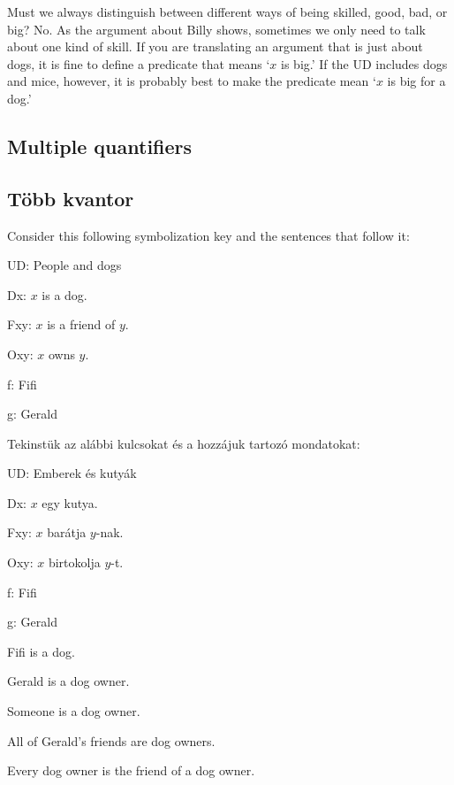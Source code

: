 Must we always distinguish between different ways of being skilled, good, bad, or big? No. As the argument about Billy shows, sometimes we only need to talk about one kind of skill. If you are translating an argument that is just about dogs, it is fine to define a predicate that means `$x$ is big.' If the UD includes dogs and mice, however, it is probably best to make the predicate mean `$x$ is big for a dog.'



\subsection*{Multiple quantifiers}
\subsection{Több kvantor}
Consider this following symbolization key and the sentences that follow it:
\begin{ekey}
\item{UD:} People and dogs
\item{Dx:} $x$ is a dog.
\item{Fxy:} $x$ is a friend of $y$.
\item{Oxy:} $x$ owns $y$.
\item{f:} Fifi
\item{g:} Gerald
\end{ekey}

Tekinstük az alábbi kulcsokat és a hozzájuk tartozó mondatokat:
\begin{ekey}
\item{UD:} Emberek és kutyák
\item{Dx:} $x$ egy kutya.
\item{Fxy:} $x$ barátja $y$-nak.
\item{Oxy:} $x$ birtokolja $y$-t.
\item{f:} Fifi
\item{g:} Gerald
\end{ekey}

\begin{earg}
\item[\ex{dog1}] Fifi is a dog.
\item[\ex{dog2}] Gerald is a dog owner.
\item[\ex{dog3}] Someone is a dog owner.
\item[\ex{dog4}] All of Gerald's friends are dog owners.
\item[\ex{dog5}] Every dog owner is the friend of a dog owner.
\end{earg}

